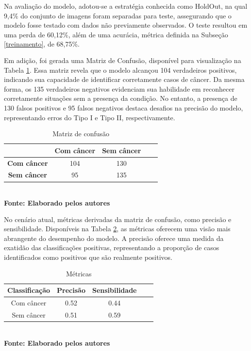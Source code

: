 Na avaliação do modelo, adotou-se a estratégia conhecida como HoldOut, na qual 9,4\% do conjunto de imagens foram separadas para teste, assegurando que o modelo fosse testado com dados não previamente observados. O teste resultou em uma perda de 60,12\%, além de uma acurácia, métrica definida na Subseção \ref{treinamento}, de 68,75\%.

Em adição, foi gerada uma Matriz de Confusão, disponível para visualização na Tabela \ref{tab:confusion}. Essa matriz revela que o modelo alcançou 104 verdadeiros positivos, indicando sua capacidade de identificar corretamente casos de câncer. Da mesma forma, os 135 verdadeiros negativos evidenciam sua habilidade em reconhecer corretamente situações sem a presença da condição. No entanto, a presença de 130 falsos positivos e 95 falsos negativos destaca desafios na precisão do modelo, representando erros do Tipo I e Tipo II, respectivamente.

\begin{table}[h]
  \centering
  \caption{Matriz de confusão}
   \label{tab:confusion}
   \vspace{-0.2cm}
\begin{tabular}{|c|c|c|c|c|} 
  \hline
     & \textbf{Com câncer} & \textbf{Sem câncer}  \\
  \hline
    \textbf{Com câncer} & 104 & 130 \\
  \hline
    \textbf{Sem câncer} & 95 & 135 \\
  \hline
\end{tabular}
	\vspace{0.2cm}
     \\\textbf{\footnotesize Fonte: Elaborado pelos autores}
\end{table}




No cenário atual, métricas derivadas da matriz de confusão, como precisão e sensibilidade. Disponíveis na Tabela \ref{tab:metricas}, as métricas oferecem uma visão mais abrangente do desempenho do modelo. A precisão oferece uma medida da exatidão das classificações positivas, representando a proporção de casos identificados como positivos que são realmente positivos. 


\begin{table}[h]
  \centering
  \caption{Métricas}
   \label{tab:metricas}
   \vspace{-0.2cm}
\begin{tabular}{|c|c|c|c|c|} 
  \hline
    Classificação & Precisão & Sensibilidade  \\ %
  \hline
    Com câncer & 0.52 & 0.44 \\ %
  \hline
    Sem câncer & 0.51 & 0.59 \\ %
  \hline
\end{tabular}
	\vspace{0.2cm}
     \\\textbf{\footnotesize Fonte: Elaborado pelos autores}
\end{table}


